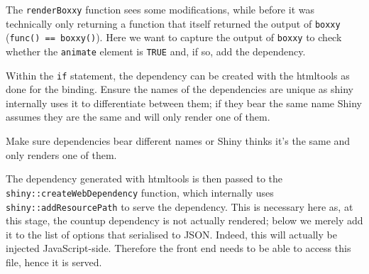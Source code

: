 \documentclass[10pt,]{krantz}
\makeatletter
\newenvironment{Shaded}{\begin{snugshade}}{\end{snugshade}}
\newcommand{\CommentTok}[1]{\textcolor[rgb]{0.37,0.37,0.37}{\textit{#1}}}
\newcommand{\ControlFlowTok}[1]{\textcolor[rgb]{0.27,0.27,0.27}{\textbf{#1}}}
\newcommand{\DataTypeTok}[1]{\textcolor[rgb]{0.27,0.27,0.27}{#1}}
\newcommand{\KeywordTok}[1]{\textcolor[rgb]{0.27,0.27,0.27}{\textbf{#1}}}
\newcommand{\NormalTok}[1]{#1}
\newcommand{\OperatorTok}[1]{\textcolor[rgb]{0.43,0.43,0.43}{\textbf{#1}}}
\newcommand{\OtherTok}[1]{\textcolor[rgb]{0.37,0.37,0.37}{#1}}
\newcommand{\StringTok}[1]{\textcolor[rgb]{0.5,0.5,0.5}{#1}}
\newenvironment{kframe}{%
\medskip{}
\setlength{\fboxsep}{.8em}
 \def\at@end@of@kframe{}%
 \ifinner\ifhmode%
  \def\at@end@of@kframe{\end{minipage}}%
  \begin{minipage}{\columnwidth}%
 \fi\fi%
 \def\FrameCommand##1{\hskip\@totalleftmargin \hskip-\fboxsep
 \colorbox{shadecolor}{##1}\hskip-\fboxsep
     \hskip-\linewidth \hskip-\@totalleftmargin \hskip\columnwidth}%
 \MakeFramed {\advance\hsize-\width
   \@totalleftmargin\z@ \linewidth\hsize
   \@setminipage}}%
 {\par\unskip\endMakeFramed%
 \at@end@of@kframe}
\renewenvironment{Shaded}{\begin{kframe}}{\end{kframe}}
\newenvironment{rmdblock}[1]
  {
  \begin{itemize}
  \renewcommand{\labelitemi}{
    \raisebox{-.7\height}[0pt][0pt]{
      {\setkeys{Gin}{width=3em,keepaspectratio}\texttt{[image: images/\#1]}}
    }
  }
  \setlength{\fboxsep}{1em}
  \begin{kframe}
  \item
  }
  {
  \end{kframe}
  \end{itemize}
  }
\newenvironment{rmdnote}
  {\begin{rmdblock}{note}}
  {\end{rmdblock}}
\makeatother
\begin{document}
The \texttt{renderBoxxy} function sees some modifications, while before it was technically only returning a function that itself returned the output of \texttt{boxxy} (\texttt{func()\ ==\ boxxy()}). Here we want to capture the output of \texttt{boxxy} to check whether the \texttt{animate} element is \texttt{TRUE} and, if so, add the dependency.

\begin{Shaded}
\end{Shaded}

Within the \texttt{if} statement, the dependency can be created with the htmltools as done for the binding. Ensure the names of the dependencies are unique as shiny internally uses it to differentiate between them; if they bear the same name Shiny assumes they are the same and will only render one of them.

\begin{rmdnote}
Make sure dependencies bear different names or Shiny thinks it's the
same and only renders one of them.
\end{rmdnote}

The dependency generated with htmltools is then passed to the \texttt{shiny::createWebDependency} function, which internally uses \texttt{shiny::addResourcePath} to serve the dependency. This is necessary here as, at this stage, the countup dependency is not actually rendered; below we merely add it to the list of options that serialised to JSON. Indeed, this will actually be injected JavaScript-side. Therefore the front end needs to be able to access this file, hence it is served.
\end{document}
